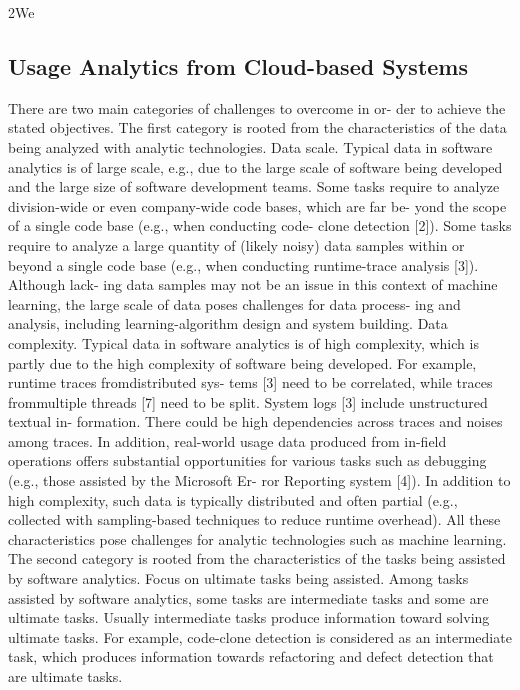 2We


\subsection{Usage Analytics from Cloud-based Systems}
	

There are two main categories of challenges to overcome in or-
der to achieve the stated objectives. The first category is rooted from the characteristics of the data being analyzed with analytic technologies. Data scale. Typical data in software analytics is of large scale,
e.g., due to the large scale of software being developed and the large size of software development teams. Some tasks require to analyze division-wide or even company-wide code bases, which are far be- yond the scope of a single code base (e.g., when conducting code- clone detection [2]). Some tasks require to analyze a large quantity of (likely noisy) data samples within or beyond a single code base (e.g., when conducting runtime-trace analysis [3]). Although lack- ing data samples may not be an issue in this context of machine learning, the large scale of data poses challenges for data process- ing and analysis, including learning-algorithm design and system building. Data complexity. Typical data in software analytics is of high
complexity, which is partly due to the high complexity of software being developed. For example, runtime traces fromdistributed sys- tems [3] need to be correlated, while traces frommultiple threads [7] need to be split. System logs [3] include unstructured textual in- formation. There could be high dependencies across traces and noises among traces. In addition, real-world usage data produced from in-field operations offers substantial opportunities for various tasks such as debugging (e.g., those assisted by the Microsoft Er- ror Reporting system [4]). In addition to high complexity, such data is typically distributed and often partial (e.g., collected with sampling-based techniques to reduce runtime overhead). All these characteristics pose challenges for analytic technologies such as machine learning. The second category is rooted from the characteristics of the
tasks being assisted by software analytics. Focus on ultimate tasks being assisted. Among tasks assisted
by software analytics, some tasks are intermediate tasks and some are ultimate tasks. Usually intermediate tasks produce information toward solving ultimate tasks. For example, code-clone detection is considered as an intermediate task, which produces information towards refactoring and defect detection that are ultimate tasks.

